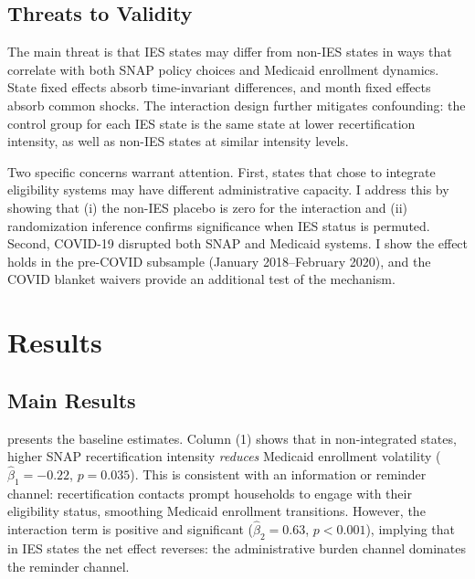 \documentclass[12pt]{article}
\begin{document}
\subsection{Threats to Validity}

The main threat is that IES states may differ from non-IES states in ways that correlate with both SNAP policy choices and Medicaid enrollment dynamics. State fixed effects absorb time-invariant differences, and month fixed effects absorb common shocks. The interaction design further mitigates confounding: the control group for each IES state is the same state at lower recertification intensity, as well as non-IES states at similar intensity levels.

Two specific concerns warrant attention. First, states that chose to integrate eligibility systems may have different administrative capacity. I address this by showing that (i) the non-IES placebo is zero for the interaction and (ii) randomization inference confirms significance when IES status is permuted. Second, COVID-19 disrupted both SNAP and Medicaid systems. I show the effect holds in the pre-COVID subsample (January 2018--February 2020), and the COVID blanket waivers provide an additional test of the mechanism.


\section{Results}

\subsection{Main Results}



 presents the baseline estimates. Column (1) shows that in non-integrated states, higher SNAP recertification intensity \textit{reduces} Medicaid enrollment volatility ($\hat{\beta}_1 = -0.22$, $p = 0.035$). This is consistent with an information or reminder channel: recertification contacts prompt households to engage with their eligibility status, smoothing Medicaid enrollment transitions. However, the interaction term is positive and significant ($\hat{\beta}_2 = 0.63$, $p < 0.001$), implying that in IES states the net effect reverses: the administrative burden channel dominates the reminder channel.
\end{document}
